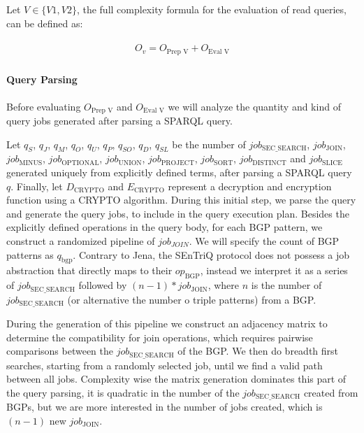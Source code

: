 Let $V \in \{V1, V2\}$, the full complexity formula for the evaluation of read queries, can be defined as:

\begin{align}
    \label{equation:query-eval-full}
    \begin{split}
        O_v = O_{\text{Prep V}} + O_{\text{Eval V}} 
    \end{split}
\end{align}

\paragraph{Query Parsing} Before evaluating $O_{\text{Prep V}}$ and $O_{\text{Eval V}}$ we will analyze the quantity and kind of query jobs generated after parsing a \gls{SPARQL} query.

Let $q_S$, $q_J$, $q_M$, $q_O$, $q_U$, $q_P$, $q_{SO}$, $q_D$, $q_{SL}$ be the number of $job_{\text{SEC\_SEARCH}}$, $job_{\text{JOIN}}$, $job_{\text{MINUS}}$, $job_{\text{OPTIONAL}}$, $job_{\text{UNION}}$, $job_{\text{PROJECT}}$, $job_{\text{SORT}}$, $job_{\text{DISTINCT}}$ and $job_{\text{SLICE}}$ generated uniquely from explicitly defined terms, after parsing a \gls{SPARQL} query $q$. Finally, let $D_{\text{CRYPTO}}$ and $E_{\text{CRYPTO}}$ represent a decryption and encryption function using a CRYPTO algorithm.
During this initial step, we parse the query and generate the query jobs, to include in the query execution plan. Besides the explicitly defined operations in the query body, for each \gls{BGP} pattern, we construct a randomized pipeline of $job_{JOIN}$. We will specify the count of \gls{BGP} patterns as $q_{\text{bgp}}$. Contrary to Jena, the \gls{SEnTriQ} protocol does not possess a job abstraction that directly maps to their $op_{\text{BGP}}$, instead we interpret it as a series of $job_{\text{SEC\_SEARCH}}$ followed by $(n - 1) * job_{\text{JOIN}}$, where $n$ is the number of $job_{\text{SEC\_SEARCH}}$ (or alternative the number o triple patterns) from a \gls{BGP}. 

During the generation of this pipeline we construct an adjacency matrix to determine the compatibility for join operations, which requires pairwise comparisons between the $job_{\text{SEC\_SEARCH}}$ of the \gls{BGP}. We then do breadth first searches, starting from a randomly selected job, until we find a valid path between all jobs. Complexity wise the matrix generation dominates this part of the query parsing, it is quadratic in the number of the $job_{\text{SEC\_SEARCH}}$ created from \gls{BGP}s, but we are more interested in the number of jobs created, which is $(n - 1)$ new $job_{\text{JOIN}}$.

